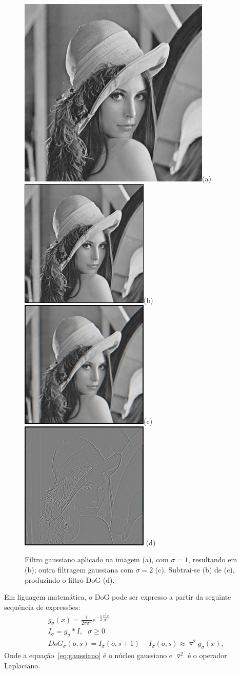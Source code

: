 \begin{figure} [!h]
	\centering
	\includegraphics[width=0.20\linewidth]{figs/lena.jpg}(a)
	\includegraphics[width=0.20\linewidth]{figs/lenaSigma1.png}(b)
	\includegraphics[width=0.20\linewidth]{figs/lenaSigma2.png}(c)
 	\includegraphics[width=0.20\linewidth]{figs/lenaDoG.png} (d)
	\caption{%
	Filtro gaussiano aplicado na imagem (a), com $\sigma = 1$, resultando
  em (b); outra filtragem gaussiana com $\sigma = 2$ (c). Subtrai-se (b)
  de (c), produzindo o filtro DoG (d).
	}\label{fig:lenadog}
\end{figure}


Em liguagem matemática, o DoG pode ser expresso a partir da seguinte sequência
de expressões: 
\begin{align}
\label{eq:gaussiano}
	&g_\sigma(x) = \frac{1}{2 \pi \sigma ^2} e^{-\frac{1}{2} \frac{x^T x}{\sigma
  ^2}}\\
\label{eq:gaussianScaleSpace}
	&I_\sigma = g_\sigma * I,\ \ \ \sigma \geq 0\\
\label{eq:DoG}
	&DoG_\sigma(o,s) = I_\sigma(o,s+1) - I_\sigma(o,s) \approx \triangledown^2
  g_\sigma(x),
\end{align}
Onde a equação~\ref{eq:gaussiano} é o núcleo gaussiano e $\triangledown^2$ é o operador Laplaciano.

